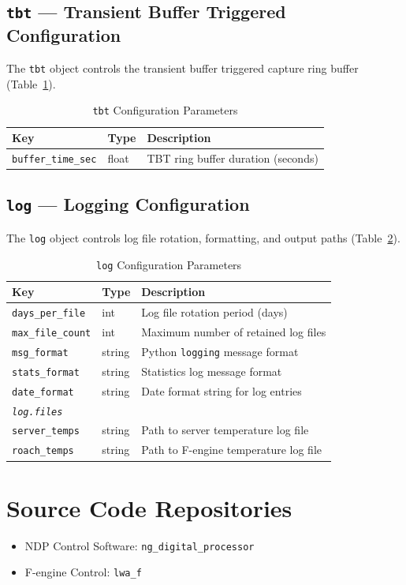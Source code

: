 \subsection{\texttt{tbt} --- Transient Buffer Triggered Configuration}

The \texttt{tbt} object controls the transient buffer triggered capture ring buffer (Table~\ref{tab:config-tbt}).

\begin{table}[htbp]
    \centering
    \caption{\texttt{tbt} Configuration Parameters}
    \label{tab:config-tbt}
    \begin{tabular}{llp{7cm}}
        \toprule
        \textbf{Key} & \textbf{Type} & \textbf{Description} \\
        \midrule
        \texttt{buffer\_time\_sec} & float & TBT ring buffer duration (seconds) \\
        \bottomrule
    \end{tabular}
\end{table}

\subsection{\texttt{log} --- Logging Configuration}

The \texttt{log} object controls log file rotation, formatting, and output paths (Table~\ref{tab:config-log}).

\begin{table}[htbp]
    \centering
    \caption{\texttt{log} Configuration Parameters}
    \label{tab:config-log}
    \begin{tabular}{llp{7cm}}
        \toprule
        \textbf{Key} & \textbf{Type} & \textbf{Description} \\
        \midrule
        \texttt{days\_per\_file}  & int    & Log file rotation period (days) \\
        \texttt{max\_file\_count} & int    & Maximum number of retained log files \\
        \texttt{msg\_format}      & string & Python \texttt{logging} message format \\
        \texttt{stats\_format}    & string & Statistics log message format \\
        \texttt{date\_format}     & string & Date format string for log entries \\
        \midrule
        \multicolumn{3}{l}{\textit{\texttt{log.files}}} \\
        \quad\texttt{server\_temps} & string & Path to server temperature log file \\
        \quad\texttt{roach\_temps}  & string & Path to F-engine temperature log file \\
        \bottomrule
    \end{tabular}
\end{table}

\section{Source Code Repositories}

\begin{itemize}
    \item NDP Control Software: \texttt{ng\_digital\_processor}
    \item F-engine Control: \texttt{lwa\_f}
\end{itemize}
